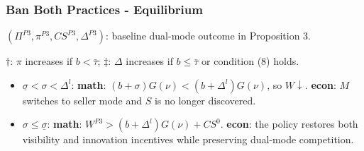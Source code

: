 \begin{frame}
  \frametitle{Ban Both Practices - Equilibrium}
  \scriptsize

  \begin{table}
    \centering
    \caption{Effects of banning both practices (Proposition 9) v.s. Table \ref{tab:Proposition5}}
    \label{tab:ban-both-practices-effects}
    \begin{threeparttable}
    \begin{tablenotes}
      \scriptsize
      \item $(\Pi^{P3},\pi^{P3},CS^{P3},\Delta^{P3})$: baseline dual-mode outcome in Proposition 3.
      \item $\dagger$: $\pi$ increases if $b<\bar{\tau}$; $\ddagger$: $\Delta$ increases if $b\leq\bar{\tau}$ or condition (8) holds.
    \end{tablenotes}
    \end{threeparttable}
  \end{table}

  \vspace{-0.15cm}
  \begin{itemize}
    \item $\underline{\sigma}<\sigma<\Delta^l$: \textbf{math}: $(b+\sigma)G(\nu)<(b+\Delta^l)G(\nu)$, so $W\downarrow$. \textbf{econ}: $M$ switches to seller mode and $S$ is no longer discovered.
    \item $\sigma\leq\underline{\sigma}$: \textbf{math}: $W^{P3}>(b+\Delta^l)G(\nu)+CS^0$. \textbf{econ}: the policy restores both visibility and innovation incentives while preserving dual-mode competition.
  \end{itemize}
\end{frame}

